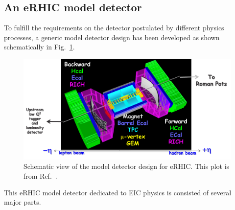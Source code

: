 \subsection{An eRHIC model detector}
To fulfill the requirements on the detector postulated by different physics processes, 
a generic model detector design has been developed as shown schematically in Fig.~\ref{fig:detector_eRHIC}.
\begin{figure}
\centering
\includegraphics[width=1.0\textwidth]{plots/chpt4/eRHIC_model_detector_2.png}
\caption[A schematic view of the eRHIC detector design]{
Schematic view of the model detector design for eRHIC. This plot is from Ref.~\cite{Aschenauer:2014a}.}
\label{fig:detector_eRHIC}
\end{figure}

This eRHIC model detector dedicated to EIC physics is consisted of several major parts.

